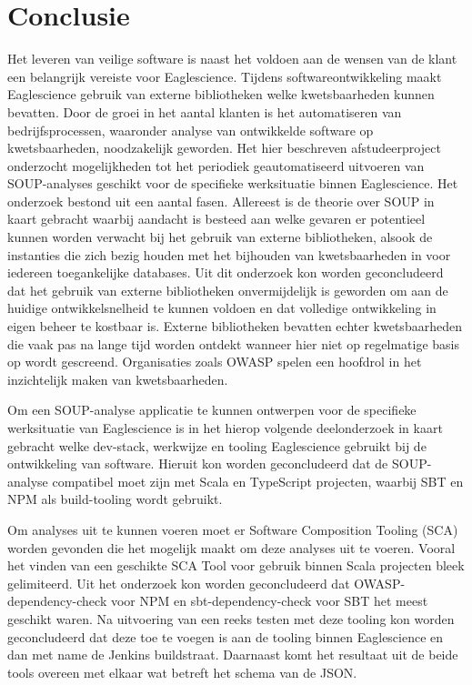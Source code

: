 
\chapter{Conclusie}\label{ch:conclusie} %

Het leveren van veilige software is naast het voldoen aan de wensen van de klant een belangrijk vereiste voor Eaglescience. Tijdens softwareontwikkeling maakt Eaglescience gebruik van externe bibliotheken welke kwetsbaarheden kunnen bevatten. Door de groei in het aantal klanten is het automatiseren van bedrijfsprocessen, waaronder analyse van ontwikkelde software op kwetsbaarheden, noodzakelijk geworden. Het hier beschreven afstudeerproject onderzocht mogelijkheden tot het periodiek geautomatiseerd uitvoeren van SOUP-analyses geschikt voor de specifieke werksituatie binnen Eaglescience.
Het onderzoek bestond uit een aantal fasen. Allereest is de theorie over SOUP in kaart gebracht waarbij aandacht is besteed aan welke gevaren er potentieel kunnen worden verwacht bij het gebruik van externe bibliotheken, alsook de instanties die zich bezig houden met het bijhouden van kwetsbaarheden in voor iedereen toegankelijke databases. Uit dit onderzoek kon worden geconcludeerd dat het gebruik van externe bibliotheken onvermijdelijk is geworden om aan de huidige ontwikkelsnelheid te kunnen voldoen en dat volledige ontwikkeling in eigen beheer te kostbaar is. Externe bibliotheken bevatten echter kwetsbaarheden die vaak pas na lange tijd worden ontdekt wanneer hier niet op regelmatige basis op wordt gescreend. Organisaties zoals OWASP spelen een hoofdrol in het inzichtelijk maken van kwetsbaarheden.

Om een SOUP-analyse applicatie te kunnen ontwerpen voor de specifieke werksituatie van Eaglescience is in het hierop volgende deelonderzoek in kaart gebracht welke dev-stack, werkwijze en tooling Eaglescience gebruikt bij de ontwikkeling van software. Hieruit kon worden geconcludeerd dat de SOUP-analyse compatibel moet zijn met Scala en TypeScript projecten, waarbij SBT en NPM als build-tooling wordt gebruikt.

Om analyses uit te kunnen voeren moet er Software Composition Tooling (SCA) worden gevonden die het mogelijk maakt om deze analyses uit te voeren. Vooral het vinden van een geschikte SCA Tool voor gebruik binnen Scala projecten bleek gelimiteerd. Uit het onderzoek kon worden geconcludeerd dat OWASP-dependency-check voor NPM en sbt-dependency-check voor SBT het meest geschikt waren. Na uitvoering van een reeks testen met deze tooling kon worden geconcludeerd dat deze toe te voegen is aan de tooling binnen Eaglescience en dan met name de Jenkins buildstraat. Daarnaast komt het resultaat uit de beide tools overeen met elkaar wat betreft het schema van de JSON.

